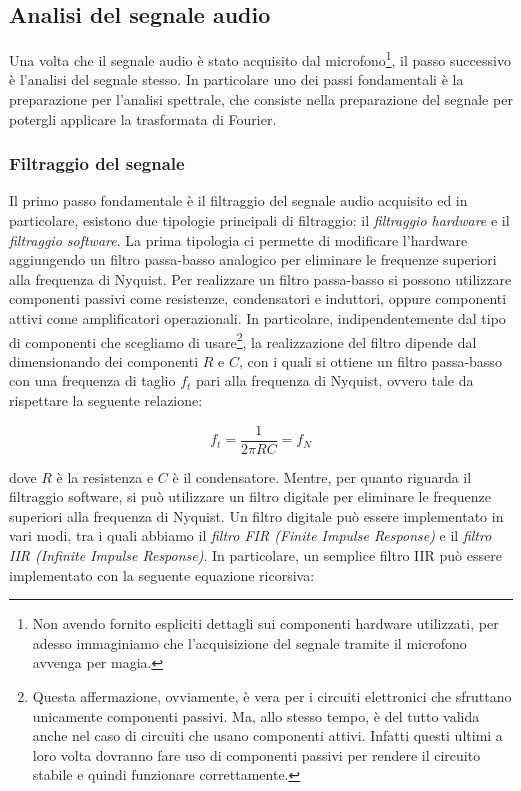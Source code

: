 \documentclass[a4paper,12pt]{report}  %
\begin{document}
\subsection{Analisi del segnale audio}
Una volta che il segnale audio è stato acquisito dal microfono\footnote{Non avendo fornito espliciti dettagli sui componenti hardware utilizzati, per adesso immaginiamo che l'acquisizione del segnale tramite il microfono avvenga per magia.}, il passo successivo è l'analisi del segnale stesso.
In particolare uno dei passi fondamentali è la preparazione per l'analisi spettrale, che consiste nella preparazione del segnale per potergli applicare la trasformata di Fourier.

\subsubsection{Filtraggio del segnale}\label{sec:filtering}
Il primo passo fondamentale è il filtraggio del segnale audio acquisito ed in particolare, esistono due tipologie principali di filtraggio: il \textit{filtraggio hardware} e il \textit{filtraggio software}.
La prima tipologia ci permette di modificare l'hardware aggiungendo un filtro passa-basso analogico per eliminare le frequenze superiori alla frequenza di Nyquist.
Per realizzare un filtro passa-basso si possono utilizzare componenti passivi come resistenze, condensatori e induttori, oppure componenti attivi come amplificatori operazionali.
In particolare, indipendentemente dal tipo di componenti che scegliamo di usare\footnote{Questa affermazione, ovviamente, è vera per i circuiti elettronici che sfruttano unicamente componenti passivi. Ma, allo stesso tempo, è del tutto valida anche nel caso di circuiti che usano componenti attivi. Infatti questi ultimi a loro volta dovranno fare uso di componenti passivi per rendere il circuito stabile e quindi funzionare correttamente.}, la realizzazione del filtro dipende dal dimensionando dei componenti $R$ e $C$, con i quali si ottiene un filtro passa-basso con una frequenza di taglio $f_t$ pari alla frequenza di Nyquist, ovvero tale da rispettare la seguente relazione:

\begin{equation}
    f_t = \frac{1}{2 \pi R C} = f_N \nonumber
\end{equation}

dove $R$ è la resistenza e $C$ è il condensatore.
Mentre, per quanto riguarda il filtraggio software, si può utilizzare un filtro digitale per eliminare le frequenze superiori alla frequenza di Nyquist.
Un filtro digitale può essere implementato in vari modi, tra i quali abbiamo il \textit{filtro FIR (Finite Impulse Response)} e il \textit{filtro IIR (Infinite Impulse Response)}.
In particolare, un semplice filtro IIR può essere implementato con la seguente equazione ricorsiva:
\end{document}
